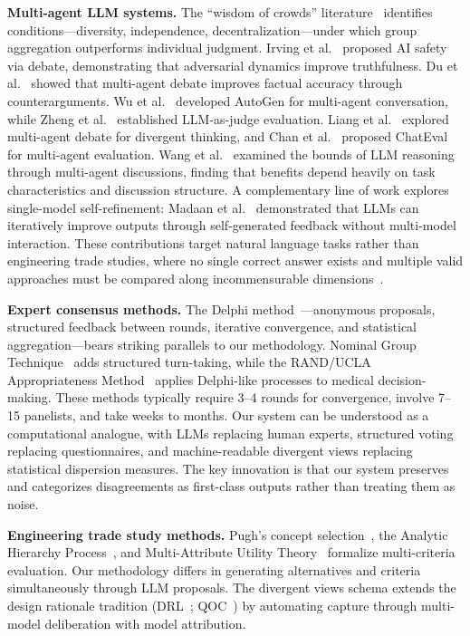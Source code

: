 \documentclass[11pt,a4paper]{article}
\begin{document}
\textbf{Multi-agent LLM systems.} The ``wisdom of crowds'' literature~\cite{surowiecki2004wisdom} identifies conditions---diversity, independence, decentralization---under which group aggregation outperforms individual judgment. Irving et al.~\cite{irving2018debate} proposed AI safety via debate, demonstrating that adversarial dynamics improve truthfulness. Du et al.~\cite{du2023debate} showed that multi-agent debate improves factual accuracy through counterarguments. Wu et al.~\cite{wu2023autogen} developed AutoGen for multi-agent conversation, while Zheng et al.~\cite{zheng2024judging} established LLM-as-judge evaluation. Liang et al.~\cite{liang2024encouraging} explored multi-agent debate for divergent thinking, and Chan et al.~\cite{chan2024chateval} proposed ChatEval for multi-agent evaluation. Wang et al.~\cite{wang2024rethinking} examined the bounds of LLM reasoning through multi-agent discussions, finding that benefits depend heavily on task characteristics and discussion structure. A complementary line of work explores single-model self-refinement: Madaan et al.~\cite{madaan2023self} demonstrated that LLMs can iteratively improve outputs through self-generated feedback without multi-model interaction. These contributions target natural language tasks rather than engineering trade studies, where no single correct answer exists and multiple valid approaches must be compared along incommensurable dimensions~\cite{keeney1976decisions}.

\textbf{Expert consensus methods.} The Delphi method~\cite{linstone1975delphi,dalkey1963experimental}---anonymous proposals, structured feedback between rounds, iterative convergence, and statistical aggregation---bears striking parallels to our methodology. Nominal Group Technique~\cite{delbecq1975group} adds structured turn-taking, while the RAND/UCLA Appropriateness Method~\cite{fitch2001rand} applies Delphi-like processes to medical decision-making. These methods typically require 3--4 rounds for convergence, involve 7--15 panelists, and take weeks to months. Our system can be understood as a computational analogue, with LLMs replacing human experts, structured voting replacing questionnaires, and machine-readable divergent views replacing statistical dispersion measures. The key innovation is that our system preserves and categorizes disagreements as first-class outputs rather than treating them as noise.

\textbf{Engineering trade study methods.} Pugh's concept selection~\cite{pugh1991total}, the Analytic Hierarchy Process~\cite{saaty1980ahp}, and Multi-Attribute Utility Theory~\cite{keeney1976decisions} formalize multi-criteria evaluation. Our methodology differs in generating alternatives and criteria simultaneously through LLM proposals. The divergent views schema extends the design rationale tradition (DRL~\cite{lee1991drl}; QOC~\cite{maclean1991qoc}) by automating capture through multi-model deliberation with model attribution.
\end{document}
